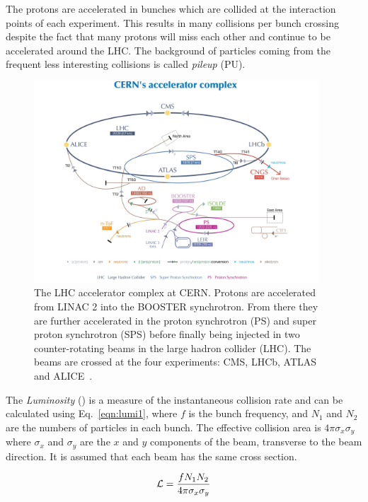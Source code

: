 The protons are accelerated in bunches which are collided at the interaction points of each experiment. This results in many collisions per bunch crossing despite the fact that many protons will miss each other and continue to be accelerated around the LHC. The background of particles coming from the frequent less interesting collisions is called \emph{pileup} (PU).

\begin{figure}[ht!]
\centering
    \includegraphics[width=0.95\textwidth]{images/LHCacc.jpg}
    \caption{The LHC accelerator complex at CERN. Protons are accelerated from LINAC 2 into the BOOSTER synchrotron. From there they are further accelerated in the proton synchrotron (PS) and super proton synchrotron (SPS) before finally being injected in two counter-rotating beams in the large hadron collider (LHC). The beams are crossed at the four experiments: CMS, LHCb, ATLAS and ALICE~\cite{Marcastel:1621583}.}
    \label{fig:LHC acc}
\end{figure}


The \emph{Luminosity} (\lumi) is a measure of the instantaneous collision rate and can be calculated using Eq.~\ref{eqn:lumi1}, where $f$ is the bunch frequency, and $N_1$ and $N_2$ are the numbers of particles in each bunch. The effective collision area is $4\pi\sigma_{x}\sigma_{y}$ where $\sigma_{x}$ and $\sigma_{y}$ are the $x$ and $y$ components of the beam, transverse to the beam direction. It is assumed that each beam has the same cross section.

\begin{equation}
\mathcal{L} = \frac{f{N}_{1}{N}_{2}}{4\pi\sigma_{x}\sigma_{y}}
\label{eqn:lumi1}
\end{equation}

